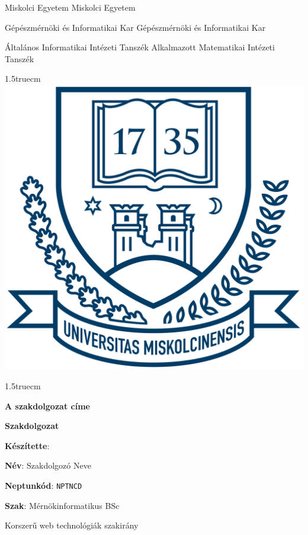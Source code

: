 \pagestyle{empty}

{\small
Miskolci Egyetem \hfill Miskolci Egyetem

Gépészmérnöki és Informatikai Kar \hfill Gépészmérnöki és Informatikai Kar

Általános Informatikai Intézeti Tanszék \hfill \hfill Alkalmazott Matematikai Intézeti Tanszék}

{\large
\begin{center}
\vglue 1.5truecm
\includegraphics[scale=0.15]{images/me_logo.png}\\
\end{center}}

\vglue 1.5truecm

{\huge
\begin{center}
\textbf{A szakdolgozat címe}
\end{center}}

\vspace*{1cm}

\begin{center}
\LARGE \textbf{Szakdolgozat}
\end{center}

\vspace*{2.5truecm}

{\large
\hspace{6.5cm} \textbf{Készítette}:


\hspace{6.5cm} \textbf{Név}: Szakdolgozó Neve


\hspace{6.5cm} \textbf{Neptunkód}: \texttt{NPTNCD}


\hspace{6.5cm} \textbf{Szak}: Mérnökinformatikus BSc


\hspace{6.5cm} Korszerű web technológiák szakirány
}

\newpage
